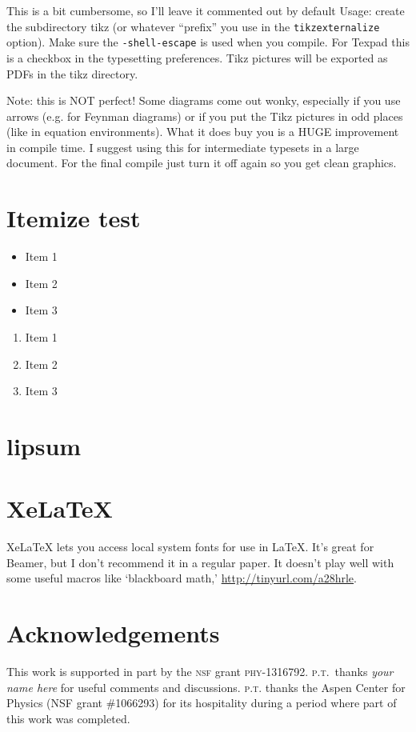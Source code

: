 \documentclass[12pt]{article}
\numberwithin{equation}{section}    %
\begin{document}
 This is a bit cumbersome, so I'll leave it commented out by default
 Usage: create the subdirectory tikz (or whatever ``prefix'' you use in
 the \texttt{tikzexternalize} option). Make sure the \texttt{-shell-escape} 
 is used when you compile. 
 For Texpad this is a checkbox in the typesetting preferences.
 Tikz pictures will be exported as PDFs in the tikz directory.

 Note: this is NOT perfect! Some diagrams come out wonky, especially if you
 use arrows (e.g. for Feynman diagrams) or if you put the Tikz pictures in
 odd places (like in equation environments). What it does buy you is a HUGE
 improvement in compile time. I suggest using this for intermediate 
 typesets in a large document. For the final compile just turn it off again
 so you get clean graphics.
 
\section{Itemize test}

\begin{itemize}%
\item Item 1
\item Item 2
\item Item 3
\end{itemize}

\begin{enumerate}%
\item Item 1
\item Item 2
\item Item 3
\end{enumerate}


 
\section{lipsum}
 
 \lipsum[3-5]


\section{XeLaTeX}

XeLaTeX lets you access local system fonts for use in \LaTeX. It's great for Beamer, but I don't recommend it in a regular paper. It doesn't play well with some useful macros like `blackboard math,' \url{http://tinyurl.com/a28hrle}.




\section*{Acknowledgements}


This work is supported in part by the \textsc{nsf} grant \textsc{phy}-1316792. 
%
\textsc{p.t.}\ thanks 
\emph{your name here}
for useful comments and discussions. 
%
\textsc{p.t.} thanks the Aspen Center for Physics (NSF grant \#1066293) for its hospitality during a period where part of this work was completed.


%  
% 
\end{document}
